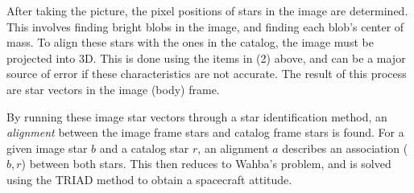 After taking the picture, the pixel positions of stars in the image are determined.
This involves finding bright blobs in the image, and finding each blob's center of mass.
To align these stars with the ones in the catalog, the image must be projected into 3D.
This is done using the items in (2) above, and can be a major source of error if these
characteristics are not accurate.
The result of this process are star vectors in the image (body) frame.

By running these image star vectors through a star identification method, an \textit{alignment} between the image frame
stars and catalog frame stars is found.
For a given image star $b$ and a catalog star $r$, an alignment $a$ describes an association ($b, r$) between both
stars.
This then reduces to Wahba's problem, and is solved using the TRIAD method to obtain a spacecraft attitude.